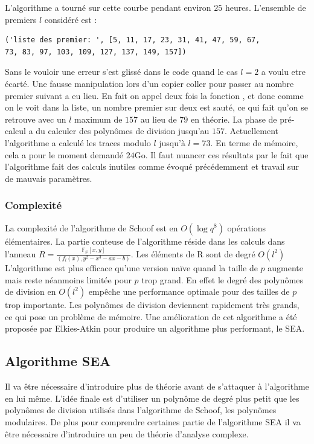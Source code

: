 \documentclass[12pt]{article}
\begin{document}
\newline
L'algorithme a tourné sur cette courbe pendant environ $25$ heures. L'ensemble de premiers $l$ considéré est : 
\medskip
\begin{lstlisting}
('liste des premier: ', [5, 11, 17, 23, 31, 41, 47, 59, 67, 
73, 83, 97, 103, 109, 127, 137, 149, 157])
\end{lstlisting}
\medskip
Sans le vouloir une erreur s'est glissé dans le code quand le cas $l=2$ a voulu etre écarté. Une fausse manipulation lors d'un copier coller pour passer au nombre premier suivant a eu lieu. En fait on appel deux fois la fonction , et donc comme on le voit dans la liste, un nombre premier sur deux est sauté, ce qui fait qu'on se retrouve avec un $l$ maximum de $157$ au lieu de $79$ en théorie. La phase de pré-calcul a du calculer des polynômes de division jusqu'au $157$. Actuellement l'algorithme a calculé les traces modulo $l$ jusqu’à $l=73$. En terme de mémoire, cela a pour le moment demandé $24$Go. Il faut nuancer ces résultats par le fait que l'algorithme fait des calculs inutiles comme évoqué précédemment et travail sur de mauvais paramètres. 
\subsubsection{Complexité}
La complexité de l'algorithme de Schoof est en $O(\log{q}^8)$ opérations élémentaires. La partie conteuse de l'algorithme réside dans les calculs dans l'anneau $R = \frac{\mathbb{F_p}[x,y]}{(f_l(x), y^2 -x^3 -ax -b)}$. Les éléments de R sont de degré $O(l^2)$ 
\newline
 L'algorithme est plus efficace qu'une version naïve quand la taille de $p$ augmente mais reste néanmoins limitée pour $p$ trop grand. En effet le degré des polynômes de division en $O(l^2)$ empêche une performance optimale pour des tailles de $p$ trop importante. Les polynômes de division deviennent rapidement très grands, ce qui pose un problème de mémoire. Une amélioration de cet algorithme a été proposée par Elkies-Atkin pour produire un algorithme plus performant, le SEA. 
 
\subsection{Algorithme SEA}
Il va être nécessaire d'introduire plus de théorie avant de s'attaquer à l'algorithme en lui même. L'idée finale est d'utiliser un polynôme de degré plus petit que les polynômes de division utilisés dans l'algorithme de Schoof, les polynômes modulaires. De plus pour comprendre certaines partie de l'algorithme SEA il va être nécessaire d'introduire un peu de théorie d'analyse complexe.
\end{document}

